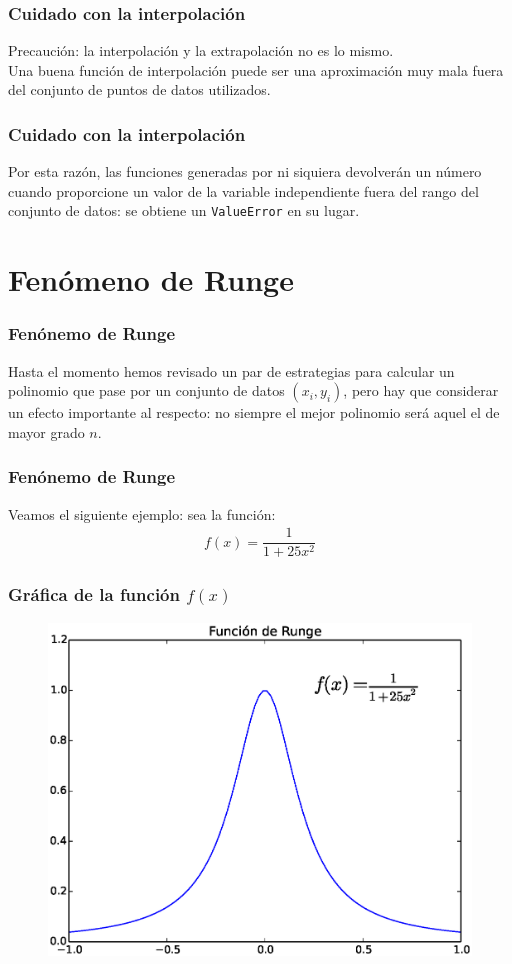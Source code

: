 \begin{frame}
\frametitle{Cuidado con la interpolación}
Precaución: la interpolación y la extrapolación no es lo mismo.
\\
\bigskip
Una buena función de interpolación puede ser una aproximación muy mala fuera del conjunto de puntos de datos utilizados. 
\end{frame}
\begin{frame}
\frametitle{Cuidado con la interpolación}
Por esta razón, las funciones generadas por  ni siquiera devolverán un número cuando proporcione un valor de la variable independiente fuera del rango del conjunto de datos: se obtiene un \texttt{ValueError} en su lugar.
\end{frame}
\section{Fenómeno de Runge}
\begin{frame}
\frametitle{Fenónemo de Runge}
Hasta el momento hemos revisado un par de estrategias para calcular un polinomio que pase por un conjunto de datos $(x_{i}, y_{i})$, pero hay que considerar un efecto importante al respecto: no siempre el mejor polinomio será aquel el de mayor grado $n$.
\end{frame}
\begin{frame}
\frametitle{Fenónemo de Runge}
Veamos el siguiente ejemplo: sea la función:
\begin{align*}
f(x) = \dfrac{1}{1 + 25 x^{2}}
\end{align*}
\end{frame}
\begin{frame}
\frametitle{Gráfica de la función $f(x)$}
\begin{figure}
	\centering
	\includegraphics[scale=0.5]{Imagenes/Funcion_Runge_01.eps} 
\end{figure}
\end{frame}
